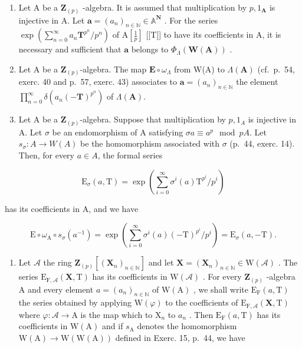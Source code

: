 \begin{enumerate}
\def\labelenumi{\alph{enumi})}
\setcounter{enumi}{2}
\item
  Let A be a \(\mathbf{Z}_{(p)}\) -algebra. It is assumed that multiplication by \(p, 1_{\mathbf{A}}\) is injective in A. Let \(\boldsymbol{a} = (a_n)_{n \in \mathbb{N}} \in \mathbb{A}^{\mathbf{N}}\) . For the series \(\exp\left(\sum_{n=0}^{\infty} a_n \mathbf{T}^{p^n} / p^n\right)\) of \(\mathrm{A}\left[\frac{1}{p}\right]\) {[}{[}T{]}{]} to have its coefficients in A, it is necessary and sufficient that \(\boldsymbol{a}\) belongs to \(\Phi_{\Lambda}(\mathbf{W}(\mathbf{A}))\) .
\item
  Let A be a \(\mathbf{Z}_{(p)}\)-algebra. The map \(\mathbf{E} \circ \omega_{\Lambda}\) from W(A) to \(\Lambda(\mathbf{A})\) (cf.~p.~54, exerc. 40 and p.~57, exerc. 43) associates to \(\boldsymbol{a} = (a_n)_{n \in \mathbb{N}}\) the element \(\prod_{n=0}^{\infty} \delta(a_n(-\mathbf{T})^{p^n})\) of \(\Lambda(\mathbf{A})\).
\item
  Let A be a \(\mathbf{Z}_{(p)}\)-algebra. Suppose that multiplication by \(p,1_{A}\) is injective in A. Let \(\sigma\) be an endomorphism of A satisfying \(\sigma a \equiv a^{p} \mod pA\). Let \(s_{\sigma}:A \to W(A)\) be the homomorphism associated with \(\sigma\) (p.~44, exerc. 14). Then, for every \(a \in A\), the formal series
\end{enumerate}

\[
\mathrm{E} _ {\sigma} (a, \mathrm{T}) = \exp (\sum_ {i = 0} ^ {\infty} \sigma^ {i} (a) \mathrm{T} ^ {p ^ {i}} / p ^ {i})
\]

has its coefficients in A, and we have

\[
\mathrm{E} \circ \omega_ {\mathrm{A}} \circ s _ {\sigma} (a ^ {- 1}) = \exp \left(\sum_ {i = 0} ^ {\infty} \sigma^ {i} (a) (- \mathrm{T}) ^ {p ^ {i}} / p ^ {i}\right) = \mathrm{E} _ {\sigma} (a, - \mathrm{T}).
\]

\begin{enumerate}
\def\labelenumi{\alph{enumi})}
\setcounter{enumi}{5}
\tightlist
\item
  Let \(\mathcal{A}\) the ring \(\mathbf{Z}_{(p)}[(\mathbf{X}_n)_{n\in\mathbb{N}}]\) and let \(\mathbf{X} = (\mathbf{X}_n)_{n\in\mathbb{N}} \in \mathrm{W}(\mathcal{A})\) . The series \(\mathrm{E}_{\mathrm{F},\mathcal{A}}(\mathbf{X},\mathrm{T})\) has its coefficients in \(\mathrm{W}(\mathcal{A})\) . For every \(\mathbf{Z}_{(p)}\) -algebra A and every element \(a = (a_n)_{n\in\mathbb{N}}\) of \(\mathrm{W}(\mathrm{A})\) , we shall write \(\mathrm{E}_{\mathrm{F}}(a,\mathrm{T})\) the series obtained by applying \(\mathrm{W}(\varphi)\) to the coefficients of \(\mathrm{E}_{\mathrm{F},\mathcal{A}}(\mathbf{X},\mathrm{T})\) where \(\varphi: \mathcal{A} \to \mathrm{A}\) is the map which to \(\mathrm{X}_n\) to \(a_n\) . Then \(\mathrm{E}_{\mathrm{F}}(a,\mathrm{T})\) has its coefficients in \(\mathrm{W}(\mathrm{A})\) and if \(s_{\mathrm{A}}\) denotes the homomorphism \(\mathrm{W}(\mathrm{A}) \to \mathrm{W}(\mathrm{W}(\mathrm{A}))\) defined in Exerc. 15, p.~44, we have
\end{enumerate}

